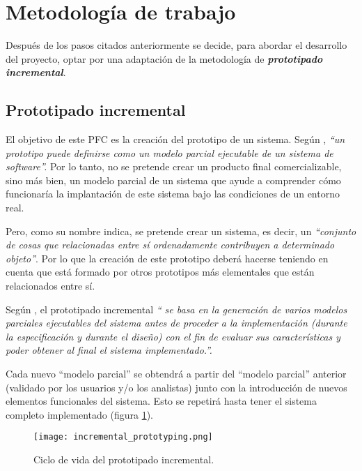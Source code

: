 \section{Metodología de trabajo}
\label{sec:workingMethodology}
Después de los pasos citados anteriormente se decide, para abordar el
desarrollo del proyecto, optar por una adaptación de la metodología de 
\emph{\textbf{prototipado incremental}}.

  \subsection{Prototipado incremental}
El objetivo de este \acs{PFC} es la creación del prototipo de un sistema.
Según \cite{bib:software_engineering}, \emph{``un prototipo puede definirse
como  un modelo parcial ejecutable de un sistema de software''.} Por lo tanto, 
no se pretende crear un producto final comercializable, sino más bien, un
modelo parcial de un sistema que ayude a comprender cómo funcionaría la
implantación de este sistema bajo las condiciones de un entorno real.

Pero, como su nombre indica, se pretende crear un sistema, es decir, un
\emph{``conjunto de cosas que relacionadas entre sí ordenadamente contribuyen 
a determinado objeto''}\cite{bib:rae}. Por lo que la creación de este prototipo
deberá hacerse teniendo en cuenta que está formado por otros prototipos más 
elementales que están relacionados entre sí.

Según \cite{bib:software_engineering}, el prototipado incremental \emph{``
se basa en la generación de varios modelos parciales ejecutables del sistema 
antes de proceder a la implementación (durante la especificación y durante el 
diseño) con el fin de evaluar sus características y poder obtener al final el 
sistema implementado.''.}

Cada nuevo ``modelo parcial'' se obtendrá a partir del ``modelo parcial''
anterior (validado por los usuarios y/o los analistas) junto con la
introducción de nuevos elementos funcionales del sistema. Esto se repetirá
hasta tener el sistema completo implementado (figura
\ref{fig:incremental_prototyping}).

\begin{figure}[!h]
  \begin{center}
    \texttt{[image: incremental\_prototyping.png]}
    \caption{Ciclo de vida del prototipado incremental.}
    \label{fig:incremental_prototyping}
  \end{center}
\end{figure}

